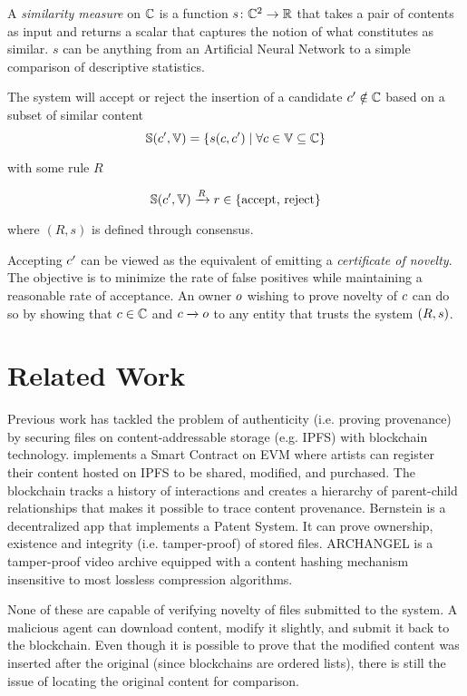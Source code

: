 \documentclass[conference]{IEEEtran}
\begin{document}
A \emph{similarity measure} on ${{\mathbb{C}}}$ is a function ${s} \colon {{\mathbb{C}}}^2 \to \mathbb{R}$ that takes a pair of contents as input and returns a scalar that captures the notion of what constitutes as similar. $s$ can be anything from an Artificial Neural Network to a simple comparison of descriptive statistics.

The system will accept or reject the insertion of a candidate ${c}^\prime \notin {{\mathbb{C}}}$ based on a subset of similar content $${\mathbb{S}}({c}^\prime, {\mathbb{V}}) = \left\{ {s}({c},{c}^\prime) \mid \forall {c} \in {\mathbb{V}} \subseteq {{\mathbb{C}}} \right\}$$

with some rule $R$ 

$${\mathbb{S}}({c}^\prime, {\mathbb{V}}) \xrightarrow{R} r \in \text{\{accept, reject\}}$$

where $(R, s)$ is defined through consensus.

Accepting ${c}^\prime$ can be viewed as the equivalent of emitting a \emph{certificate of novelty}. The objective is to minimize the rate of false positives while maintaining a reasonable rate of acceptance. An owner ${o}$ wishing to prove novelty of ${c}$ can do so by showing that ${c} \in {{\mathbb{C}}}$ and ${c} \xrightarrow{} {o}$ to any entity that trusts the system $\left(R, {s} \right)$.

\section{Related Work}
Previous work has tackled the problem of authenticity (i.e. proving provenance) by securing files on content-addressable storage (e.g. IPFS) with blockchain technology. \cite{hasan2019combating} implements a Smart Contract on EVM where artists can register their content hosted on IPFS to be shared, modified, and purchased. The blockchain tracks a history of interactions and creates a hierarchy of parent-child relationships that makes it possible to trace content provenance. Bernstein \cite{Bernstein} is a decentralized app that implements a Patent System. It can prove ownership, existence and integrity (i.e. tamper-proof) of stored files. ARCHANGEL \cite{bui2019archangel} is a tamper-proof video archive equipped with a content hashing mechanism insensitive to most lossless compression algorithms.

None of these are capable of verifying novelty of files submitted to the system. A malicious agent can download content, modify it slightly, and submit it back to the blockchain. Even though it is possible to prove that the modified content was inserted after the original (since blockchains are ordered lists), there is still the issue of locating the original content for comparison. 
\end{document}
